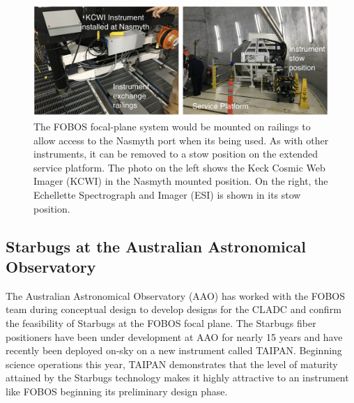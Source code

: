 \documentclass[oneside,11pt]{amsart}
\begin{document}
\begin{figure}[h!]
%
\vskip -0.1in
%
\includegraphics[width=\textwidth]{figs/Keck_instrument_exchange.png}
%
\caption{\small The FOBOS focal-plane system would be mounted on
railings to allow access to the Nasmyth port when its being used.  As
with other instruments, it can be removed to a stow position on the
extended service platform.  The photo on the left shows the Keck Cosmic
Web Imager (KCWI) in the Nasmyth mounted position.  On the right, the
Echellette Spectrograph and Imager (ESI) is shown in its stow position.}
%
\label{fig:keck_exchange}
%
\end{figure}

\subsection{Starbugs at the Australian Astronomical Observatory}
\label{sec:AAO}

The Australian Astronomical Observatory (AAO) has worked with the FOBOS
team during conceptual design to develop designs for the CLADC and
confirm the feasibility of Starbugs at the FOBOS focal plane.  The
Starbugs fiber positioners have been under development at AAO for nearly
15 years \citep[see][]{staszak16} and have recently been deployed on-sky
on a new instrument called TAIPAN.  Beginning science operations this
year, TAIPAN demonstrates that the level of maturity attained by the
Starbugs technology makes it highly attractive to an instrument like
FOBOS beginning its preliminary design phase.
\end{document}

